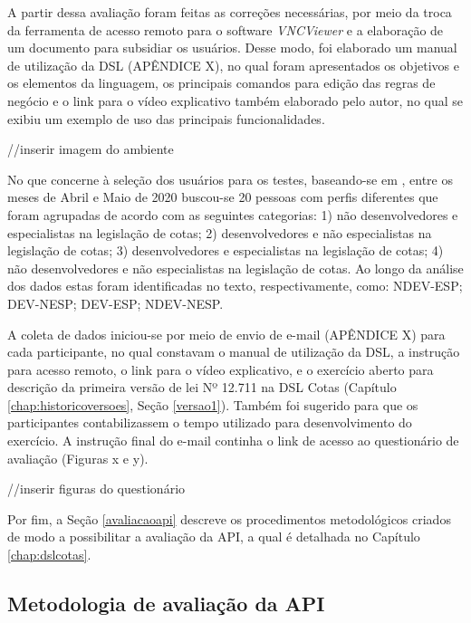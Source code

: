  A partir dessa avaliação foram feitas as correções necessárias, por meio da troca da ferramenta de acesso remoto para o software \textit{VNCViewer} e a elaboração de um documento para subsidiar os usuários. Desse modo, foi elaborado um manual de utilização da DSL (APÊNDICE X), no qual foram apresentados os objetivos e os elementos da linguagem, os principais comandos para edição das regras de negócio e o link para o vídeo explicativo também elaborado pelo autor, no qual se exibiu um exemplo de uso das principais funcionalidades. 
 
 //inserir imagem do ambiente
 
 No que concerne à seleção dos usuários para os testes, baseando-se em , entre os meses de Abril e Maio de 2020 buscou-se 20 pessoas com perfis diferentes que foram agrupadas de acordo com as seguintes categorias: 1) não desenvolvedores e especialistas na legislação de cotas; 2) desenvolvedores e não especialistas na legislação de cotas; 3) desenvolvedores e especialistas na legislação de cotas; 4) não desenvolvedores e não especialistas na legislação de cotas. Ao longo da análise dos dados estas foram identificadas no texto, respectivamente, como: NDEV-ESP; DEV-NESP; DEV-ESP; NDEV-NESP. 

 A coleta de dados iniciou-se por meio de envio de e-mail (APÊNDICE X) para cada participante, no qual constavam o manual de utilização da DSL, a instrução para acesso remoto, o link para o vídeo explicativo, e o exercício aberto para descrição da primeira versão de lei Nº 12.711 na DSL Cotas (Capítulo \ref{chap:historicoversoes}, Seção \ref{versao1}). Também foi sugerido para que os participantes contabilizassem o tempo utilizado para desenvolvimento do exercício. A instrução final do e-mail continha o link de acesso ao questionário de avaliação (Figuras x e y).
 
 //inserir figuras do questionário
 
 Por fim, a Seção \ref{avaliacaoapi} descreve os procedimentos metodológicos criados de modo a possibilitar a avaliação da \gls{API}, a qual é detalhada no Capítulo \ref{chap:dslcotas}.
 
\subsection{Metodologia de avaliação da API}
\label{metodoapi}
